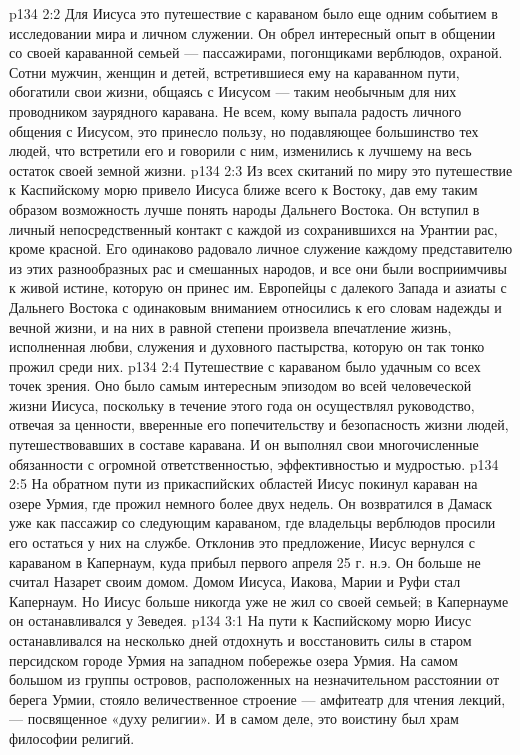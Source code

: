 \vs p134 2:2 Для Иисуса это путешествие с караваном было еще одним событием в исследовании мира и личном служении. Он обрел интересный опыт в общении со своей караванной семьей --- пассажирами, погонщиками верблюдов, охраной. Сотни мужчин, женщин и детей, встретившиеся ему на караванном пути, обогатили свои жизни, общаясь с Иисусом --- таким необычным для них проводником заурядного каравана. Не всем, кому выпала радость личного общения с Иисусом, это принесло пользу, но подавляющее большинство тех людей, что встретили его и говорили с ним, изменились к лучшему на весь остаток своей земной жизни.
\vs p134 2:3 Из всех скитаний по миру это путешествие к Каспийскому морю привело Иисуса ближе всего к Востоку, дав ему таким образом возможность лучше понять народы Дальнего Востока. Он вступил в личный непосредственный контакт с каждой из сохранившихся на Урантии рас, кроме красной. Его одинаково радовало личное служение каждому представителю из этих разнообразных рас и смешанных народов, и все они были восприимчивы к живой истине, которую он принес им. Европейцы с далекого Запада и азиаты с Дальнего Востока с одинаковым вниманием относились к его словам надежды и вечной жизни, и на них в равной степени произвела впечатление жизнь, исполненная любви, служения и духовного пастырства, которую он так тонко прожил среди них.
\vs p134 2:4 \pc Путешествие с караваном было удачным со всех точек зрения. Оно было самым интересным эпизодом во всей человеческой жизни Иисуса, поскольку в течение этого года он осуществлял руководство, отвечая за ценности, вверенные его попечительству и безопасность жизни людей, путешествовавших в составе каравана. И он выполнял свои многочисленные обязанности с огромной ответственностью, эффективностью и мудростью.
\vs p134 2:5 На обратном пути из прикаспийских областей Иисус покинул караван на озере Урмия, где прожил немного более двух недель. Он возвратился в Дамаск уже как пассажир со следующим караваном, где владельцы верблюдов просили его остаться у них на службе. Отклонив это предложение, Иисус вернулся с караваном в Капернаум, куда прибыл первого апреля 25 г. н.э. Он больше не считал Назарет своим домом. Домом Иисуса, Иакова, Марии и Руфи стал Капернаум. Но Иисус больше никогда уже не жил со своей семьей; в Капернауме он останавливался у Зеведея.
\vs p134 3:1 На пути к Каспийскому морю Иисус останавливался на несколько дней отдохнуть и восстановить силы в старом персидском городе Урмия на западном побережье озера Урмия. На самом большом из группы островов, расположенных на незначительном расстоянии от берега Урмии, стояло величественное строение --- амфитеатр для чтения лекций, --- посвященное «духу религии». И в самом деле, это воистину был храм философии религий.
